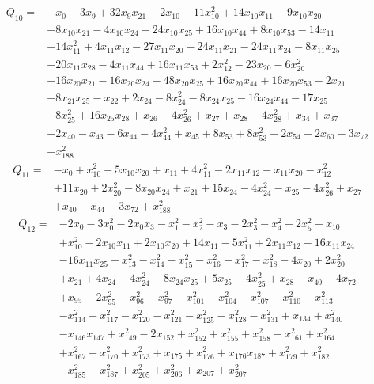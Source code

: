 \begin{equation*}\begin{aligned}
Q_{10}={}& -x_{0}-3x_{9}+32x_{9}x_{21}-2x_{10}+11x_{10}^{2}+14x_{10}x_{11}-9x_{10}x_{20}\\
& -8x_{10}x_{21}-4x_{10}x_{24}-24x_{10}x_{25}+16x_{10}x_{44}+8x_{10}x_{53}-14x_{11}\\
& -14x_{11}^{2}+4x_{11}x_{12}-27x_{11}x_{20}-24x_{11}x_{21}-24x_{11}x_{24}-8x_{11}x_{25}\\
& +20x_{11}x_{28}-4x_{11}x_{44}+16x_{11}x_{53}+2x_{12}^{2}-23x_{20}-6x_{20}^{2}\\
& -16x_{20}x_{21}-16x_{20}x_{24}-48x_{20}x_{25}+16x_{20}x_{44}+16x_{20}x_{53}-2x_{21}\\
& -8x_{21}x_{25}-x_{22}+2x_{24}-8x_{24}^{2}-8x_{24}x_{25}-16x_{24}x_{44}-17x_{25}\\
& +8x_{25}^{2}+16x_{25}x_{28}+x_{26}-4x_{26}^{2}+x_{27}+x_{28}+4x_{28}^{2}+x_{34}+x_{37}\\
& -2x_{40}-x_{43}-6x_{44}-4x_{44}^{2}+x_{45}+8x_{53}+8x_{53}^{2}-2x_{54}-2x_{60}-3x_{72}\\
& +x_{188}^{2}
\end{aligned}\end{equation*}
\begin{equation*}\begin{aligned}
Q_{11}={}& -x_{0}+x_{10}^{2}+5x_{10}x_{20}+x_{11}+4x_{11}^{2}-2x_{11}x_{12}-x_{11}x_{20}-x_{12}^{2}\\
& +11x_{20}+2x_{20}^{2}-8x_{20}x_{24}+x_{21}+15x_{24}-4x_{24}^{2}-x_{25}-4x_{26}^{2}+x_{27}\\
& +x_{40}-x_{44}-3x_{72}+x_{188}^{2}
\end{aligned}\end{equation*}
\begin{equation*}\begin{aligned}
Q_{12}={}& -2x_{0}-3x_{0}^{2}-2x_{0}x_{3}-x_{1}^{2}-x_{2}^{2}-x_{3}-2x_{3}^{2}-x_{4}^{2}-2x_{5}^{2}+x_{10}\\
& +x_{10}^{2}-2x_{10}x_{11}+2x_{10}x_{20}+14x_{11}-5x_{11}^{2}+2x_{11}x_{12}-16x_{11}x_{24}\\
& -16x_{11}x_{25}-x_{13}^{2}-x_{14}^{2}-x_{15}^{2}-x_{16}^{2}-x_{17}^{2}-x_{18}^{2}-4x_{20}+2x_{20}^{2}\\
& +x_{21}+4x_{24}-4x_{24}^{2}-8x_{24}x_{25}+5x_{25}-4x_{25}^{2}+x_{28}-x_{40}-4x_{72}\\
& +x_{95}-2x_{95}^{2}-x_{96}^{2}-x_{97}^{2}-x_{101}^{2}-x_{104}^{2}-x_{107}^{2}-x_{110}^{2}-x_{113}^{2}\\
& -x_{114}^{2}-x_{117}^{2}-x_{120}^{2}-x_{121}^{2}-x_{125}^{2}-x_{128}^{2}-x_{131}^{2}+x_{134}+x_{140}^{2}\\
& -x_{146}x_{147}+x_{149}^{2}-2x_{152}+x_{152}^{2}+x_{155}^{2}+x_{158}^{2}+x_{161}^{2}+x_{164}^{2}\\
& +x_{167}^{2}+x_{170}^{2}+x_{173}^{2}+x_{175}+x_{176}^{2}+x_{176}x_{187}+x_{179}^{2}+x_{182}^{2}\\
& -x_{185}^{2}-x_{187}^{2}+x_{205}^{2}+x_{206}^{2}+x_{207}+x_{207}^{2}
\end{aligned}\end{equation*}
